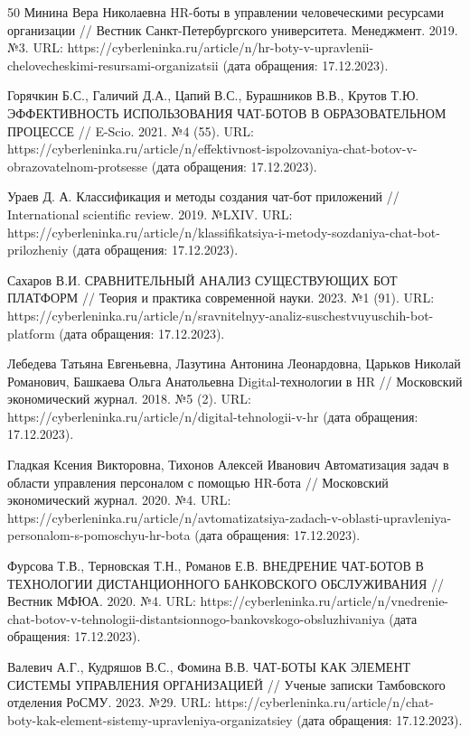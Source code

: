 \documentclass{article}
\begin{document}
\begin{thebibliography} {50}
Минина Вера Николаевна HR-боты в управлении человеческими ресурсами организации // Вестник Санкт-Петербургского университета. Менеджмент. 2019. №3. URL: https://cyberleninka.ru/article/n/hr-boty-v-upravlenii-chelovecheskimi-resursami-organizatsii (дата обращения: 17.12.2023).

Горячкин Б.С., Галичий Д.А., Цапий В.С., Бурашников В.В., Крутов Т.Ю. ЭФФЕКТИВНОСТЬ ИСПОЛЬЗОВАНИЯ ЧАТ-БОТОВ В ОБРАЗОВАТЕЛЬНОМ ПРОЦЕССЕ // E-Scio. 2021. №4 (55). URL: https://cyberleninka.ru/article/n/effektivnost-ispolzovaniya-chat-botov-v-obrazovatelnom-protsesse (дата обращения: 17.12.2023).

Ураев Д. А. Классификация и методы создания чат-бот приложений // International scientific review. 2019. №LXIV. URL: https://cyberleninka.ru/article/n/klassifikatsiya-i-metody-sozdaniya-chat-bot-prilozheniy (дата обращения: 17.12.2023).

Сахаров В.И. СРАВНИТЕЛЬНЫЙ АНАЛИЗ СУЩЕСТВУЮЩИХ БОТ ПЛАТФОРМ // Теория и практика современной науки. 2023. №1 (91). URL: https://cyberleninka.ru/article/n/sravnitelnyy-analiz-suschestvuyuschih-bot-platform (дата обращения: 17.12.2023).

Лебедева Татьяна Евгеньевна, Лазутина Антонина Леонардовна, Царьков Николай Романович, Башкаева Ольга Анатольевна Digital-технологии в HR // Московский экономический журнал. 2018. №5 (2). URL: https://cyberleninka.ru/article/n/digital-tehnologii-v-hr (дата обращения: 17.12.2023).

Гладкая Ксения Викторовна, Тихонов Алексей Иванович Автоматизация задач в области управления персоналом с помощью HR-бота // Московский экономический журнал. 2020. №4. URL: https://cyberleninka.ru/article/n/avtomatizatsiya-zadach-v-oblasti-upravleniya-personalom-s-pomoschyu-hr-bota (дата обращения: 17.12.2023).

Фурсова Т.В., Терновская Т.Н., Романов Е.В. ВНЕДРЕНИЕ ЧАТ-БОТОВ В ТЕХНОЛОГИИ ДИСТАНЦИОННОГО БАНКОВСКОГО ОБСЛУЖИВАНИЯ // Вестник МФЮА. 2020. №4. URL: https://cyberleninka.ru/article/n/vnedrenie-chat-botov-v-tehnologii-distantsionnogo-bankovskogo-obsluzhivaniya (дата обращения: 17.12.2023).

Валевич А.Г., Кудряшов В.С., Фомина В.В. ЧАТ-БОТЫ КАК ЭЛЕМЕНТ СИСТЕМЫ УПРАВЛЕНИЯ ОРГАНИЗАЦИЕЙ // Ученые записки Тамбовского отделения РоСМУ. 2023. №29. URL: https://cyberleninka.ru/article/n/chat-boty-kak-element-sistemy-upravleniya-organizatsiey (дата обращения: 17.12.2023).


\end{thebibliography}
\end{document}
